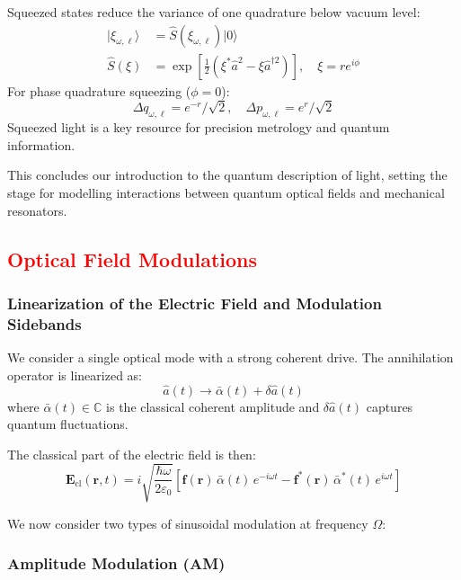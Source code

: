 Squeezed states reduce the variance of one quadrature below vacuum level:
\begin{align}
|\xi_{\omega,\ell}\rangle &= \hat{S}(\xi_{\omega,\ell}) |0\rangle \\
\hat{S}(\xi) &= \exp\left[\frac{1}{2}(\xi^* \hat{a}^2 - \xi \hat{a}^{\dagger 2})\right], \quad \xi = r e^{i\phi}
\end{align}
For phase quadrature squeezing ($\phi = 0$):
\begin{equation}
\Delta q_{\omega,\ell} = e^{-r}/\sqrt{2}, \quad \Delta p_{\omega,\ell} = e^{r}/\sqrt{2}
\end{equation}
Squeezed light is a key resource for precision metrology and quantum information.


\vspace{1em}
This concludes our introduction to the quantum description of light, setting the stage for modelling interactions between quantum optical fields and mechanical resonators.

\subsection{\textcolor{red}{Optical Field Modulations}}
\subsubsection*{Linearization of the Electric Field and Modulation Sidebands}

We consider a single optical mode with a strong coherent drive. The annihilation operator is linearized as:
\begin{equation}
    \hat{a}(t) \to \bar{\alpha}(t) + \delta \hat{a}(t)
\end{equation}
where $\bar{\alpha}(t) \in \mathbb{C}$ is the classical coherent amplitude and $\delta \hat{a}(t)$ captures quantum fluctuations.

The classical part of the electric field is then:
\begin{equation}
    \mathbf{E}_{\text{cl}}(\mathbf{r}, t) = i \sqrt{\frac{\hbar \omega}{2 \varepsilon_0}} \left[
    \mathbf{f}(\mathbf{r})\, \bar{\alpha}(t)\, e^{-i \omega t}
    - \mathbf{f}^*(\mathbf{r})\, \bar{\alpha}^*(t)\, e^{i \omega t}
    \right]
\end{equation}

We now consider two types of sinusoidal modulation at frequency $\Omega$:

\subsubsection*{Amplitude Modulation (AM)}

